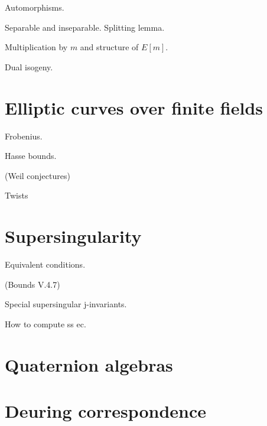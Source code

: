 Automorphisms.

Separable and inseparable. Splitting lemma.

Multiplication by $m$ and structure of $E[m]$.

Dual isogeny.

\section{Elliptic curves over finite fields}

Frobenius.

Hasse bounds.

(Weil conjectures)

Twists

\section{Supersingularity}

Equivalent conditions.

(Bounds V.4.7)

Special supersingular j-invariants.

How to compute ss ec.

\section{Quaternion algebras}

\section{Deuring correspondence}


